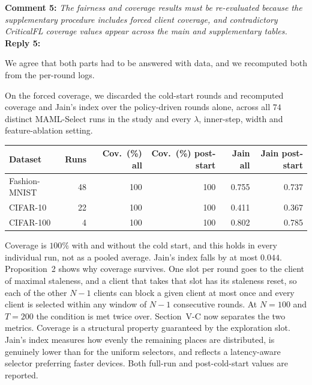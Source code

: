 \documentclass[10pt]{article}
\begin{document}
\noindent
\textbf{Comment 5:} \textit{The fairness and coverage results must be re-evaluated because the supplementary procedure includes forced client coverage, and contradictory CriticalFL coverage values appear across the main and supplementary tables.}\\
\noindent
\textbf{Reply 5:} {We agree that both parts had to be answered with data, and we recomputed both from the per-round logs.

On the forced coverage, we discarded the cold-start rounds and recomputed coverage and Jain's index over the policy-driven rounds alone, across all $74$ distinct MAML-Select runs in the study and every $\lambda$, inner-step, width and feature-ablation setting.

\begin{center}
\begin{tabular}{lrrrrr}
\toprule
Dataset & Runs & Cov.\ (\%) all & Cov.\ (\%) post-start & Jain all & Jain post-start \\
\midrule
Fashion-MNIST & 48 & 100 & 100 & 0.755 & 0.737 \\
CIFAR-10      & 22 & 100 & 100 & 0.411 & 0.367 \\
CIFAR-100     & 4  & 100 & 100 & 0.802 & 0.785 \\
\bottomrule
\end{tabular}
\end{center}

Coverage is $100\%$ with and without the cold start, and this holds in every individual run, not as a pooled average. Jain's index falls by at most $0.044$. Proposition~2 shows why coverage survives. One slot per round goes to the client of maximal staleness, and a client that takes that slot has its staleness reset, so each of the other $N-1$ clients can block a given client at most once and every client is selected within any window of $N-1$ consecutive rounds. At $N=100$ and $T=200$ the condition is met twice over. Section~V-C now separates the two metrics. Coverage is a structural property guaranteed by the exploration slot. Jain's index measures how evenly the remaining places are distributed, is genuinely lower than for the uniform selectors, and reflects a latency-aware selector preferring faster devices. Both full-run and post-cold-start values are reported.

}
\end{document}
